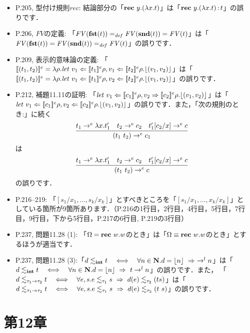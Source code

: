 \documentclass[12pt,titlepage,twoside,openright,dvipdfmx]{jsbook}
\theoremstyle{definition}
\begin{document}
\begin{itemize}
\item P.205, 型付け規則$\mathit{rec}$: 結論部分の「${\bf rec}\ {y.(\lambda x.t)}$」は「${\bf rec}\ {y.(\lambda x.t)} \operatorname{{:}} t$」の誤りです．
\item P.206, $\mathit{FV}$の定義:
  「$\mathit{FV}({\bf fst}(t)) =_{\mathit{def}} \mathit{FV}({\bf snd}(t)) = \mathit{FV}(t)$」は「$\mathit{FV}({\bf fst}(t)) = \mathit{FV}({\bf snd}(t)) =_{\mathit{def}} \mathit{FV}(t)$」の誤りです．
\item P.209, 表示的意味論の定義:
  「$\eden{(t_1,t_2)} = \lambda\rho.{\it let}\ v_1\Leftarrow\eden{t_1}\rho, v_1\Leftarrow\eden{t_2}\rho.\floor{(v_1,v_2)}$」は「$\eden{(t_1,t_2)} = \lambda\rho.{\it let}\ v_1\Leftarrow\eden{t_1}\rho, v_2\Leftarrow\eden{t_2}\rho.\floor{(v_1,v_2)}$」の誤りです．
\item P.212, 補題11.11の証明:
  「$\mathit{let}\ v_1\Leftarrow\eden{c_1}\rho,v_2\Rightarrow\eden{c_2}\rho.\floor{(v_1,v_2)}$」は「$\mathit{let}\ v_1\Leftarrow\eden{c_1}\rho,v_2\Leftarrow\eden{c_2}\rho.\floor{(v_1,v_2)}$」の誤りです．また，「次の規則のとき:」に続く
   \[
     \infer{(t_1\ t_2)\to^e c_1}{
       t_1\to^e\lambda x.t'_1
       & t_2\to^e c_2
       & t'_1[c_2/x] \to^e c}
   \]
   は
   \[
     \infer{(t_1\ t_2)\to^e c}{
       t_1\to^e\lambda x.t'_1
       & t_2\to^e c_2
       & t'_1[c_2/x] \to^e c}
   \]
   の誤りです．
 \item P.216--219:
   「$[s_1/x_1,\ldots,s_k/x_k]$」とすべきところを「$[s_1/x_1,\ldots,x_k/x_k]$」としている箇所が9箇所あります．（P.216の1行目，2行目，4行目，5行目，7行目，9行目，下から5行目，P.217の6行目, P.219の3行目）
 \item P.237, 問題11.28 (1): 「$\Omega={\bf rec}\ {w.w}$のとき」は「$\Omega \equiv {\bf rec}\ {w.w}$のとき」とするほうが適当です．
 \item P.237, 問題11.28
   (3):「$d\lesssim_{\bf int} t \quad \Longleftrightarrow\quad \forall
   n\in{\bf N}.d=\lfloor{n}\rfloor \ \Rightarrow\ \to^l
   n$」は「$d\lesssim_{\bf int} t \quad \Longleftrightarrow\quad \forall
   n\in{\bf N}.d=\lfloor{n}\rfloor \ \Rightarrow\ t \to^l n$」の誤りです．また，
   「$d\lesssim_{\tau_1\to\tau_2}t \quad \Longleftrightarrow\quad
   \forall e,s.e\lesssim_{\tau_1}s\ \Rightarrow\ d(e)\lesssim_{\tau_2}(t
   s)$」は「$d\lesssim_{\tau_1\to\tau_2}t \quad
   \Longleftrightarrow\quad \forall e,s.e\lesssim_{\tau_1}s\
   \Rightarrow\ d(e)\lesssim_{\tau_2}(t\ s)$」の誤りです．
\end{itemize}

\section*{第12章}
\end{document}
